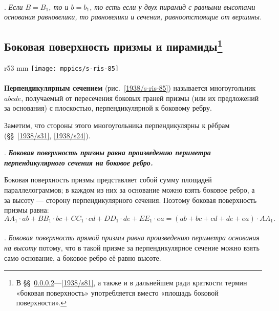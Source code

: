 \paragraph{}\label{1938/s77}
.
\emph{Если $B=B_1$, то и $b=b_1$, то есть если у двух пирамид с равными высотами основания равновелики, то равновелики и сечения, равноотстоящие от вершины.}


\subsection*{Боковая поверхность призмы и пирамиды\footnote{В §§~\ref{1938/s78}—\ref{1938/s81}, а также и в дальнейшем ради краткости термин «боковая поверхность» употребляется вместо «площадь боковой поверхности».}}

\begin{wrapfigure}{r}{53 mm}
\vskip-0mm
\centering
\texttt{[image: mppics/s-ris-85]}
\caption{}\label{1938/s-ris-85}
\vskip-0mm
\end{wrapfigure}

\paragraph{}\label{1938/s78} \textbf{Перпендикулярным сечением} (рис.~\ref{1938/s-ris-85}) называется многоугольник $abcde$, получаемый от пересечения боковых граней призмы (или их предложений за основания) с плоскостью, перпендикулярной к боковому ребру.

Заметим, что стороны этого многоугольника перпендикулярны к рёбрам (§§~\ref{1938/s31}, \ref{1938/s24}).

\medskip

\mbox{.}
\textbf{\emph{Боковая поверхность призмы равна произведению периметра перпендикулярного сечения на боковое ребро.}}

{\sloppy

Боковая поверхность призмы представляет собой сумму площадей параллелограммов;
в каждом из них за основание можно взять боковое ребро, а за высоту — сторону перпендикулярного сечения.
Поэтому боковая поверхность призмы равна:
\[AA_1\cdot ab+ BB_1\cdot bc+CC_1\cdot cd+DD_1\cdot de+EE_1\cdot ea
=
(ab+ bc+ cd+ de+ ea)\cdot AA_1.\]

}

\paragraph{}\label{1938/s79}
.
\emph{Боковая поверхность прямой призмы равна произведению периметра основания на высоту} потому, что в такой призме за перпендикулярное сечение можно взять само основание, а боковое ребро её равно высоте.

